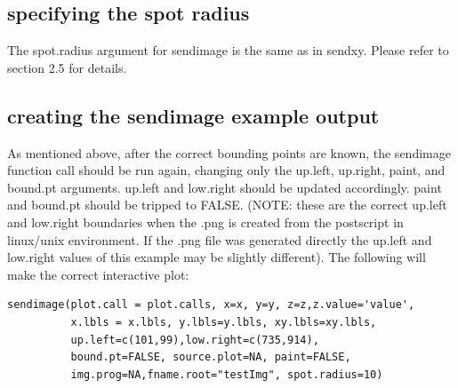 \documentclass[]{article}
\begin{document}
\subsection{specifying the spot radius}

\indent The spot.radius argument for sendimage is the same as in sendxy. Please refer to section 2.5 for details. 

\subsection{creating the sendimage example output}

\indent As mentioned above, after the correct bounding points are known, the sendimage function call should be run again, changing only the up.left, up.right, paint, and bound.pt arguments. up.left and low.right should be updated accordingly. paint and bound.pt should be tripped to FALSE. (NOTE: these are the correct up.left and low.right boundaries when the .png is created from the postscript in linux/unix environment. If the .png file was generated directly the up.left and low.right values of this example may be slightly different).  The following will make the correct interactive plot:
\begin{verbatim}
sendimage(plot.call = plot.calls, x=x, y=y, z=z,z.value='value',
          x.lbls = x.lbls, y.lbls=y.lbls, xy.lbls=xy.lbls,
          up.left=c(101,99),low.right=c(735,914),
          bound.pt=FALSE, source.plot=NA, paint=FALSE,
          img.prog=NA,fname.root="testImg", spot.radius=10)

\end{verbatim}
\end{document}
